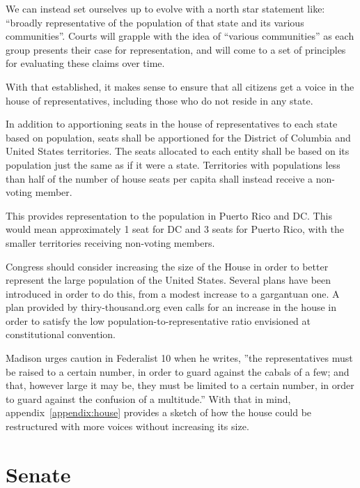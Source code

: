 \documentclass{article}
\begin{document}
We can instead set ourselves up to evolve with a north star statement like: “broadly representative of the population of that state and its various communities”. Courts will grapple with the idea of “various communities” as each group presents their case for representation, and will come to a set of principles for evaluating these claims over time.

With that established, it makes sense to ensure that all citizens get a voice in the house of representatives, including those who do not reside in any state.

\begin{quoting}
In addition to apportioning seats in the house of representatives to each state based on population, seats shall be apportioned for the District of Columbia and United States territories. The seats allocated to each entity shall be based on its population just the same as if it were a state. Territories with populations less than half of the number of house seats per capita shall instead receive a non-voting member.
\end{quoting}

This provides representation to the population in Puerto Rico and DC. This would mean approximately 1 seat for DC and 3 seats for Puerto Rico, with the smaller territories receiving non-voting members.

Congress should consider increasing the size of the House in order to better represent the large population of the United States. Several plans have been introduced in order to do this, from a modest increase to a gargantuan one\cite{Allen}. A plan provided by thiry-thousand.org even calls for an increase in the house in order to satisfy the low population-to-representative ratio envisioned at constitutional convention\cite{30000}.

Madison urges caution in Federalist 10 when he writes, ”the representatives must be raised to a certain number, in order to guard against the cabals of a few; and that, however large it may be, they must be limited to a certain number, in order to guard against the confusion of a multitude.”\cite{Federalist10} With that in mind, appendix~\ref{appendix:house} provides a sketch of how the house could be restructured with more voices without increasing its size.

\section{Senate}
\label{section:Senate}
\end{document}
